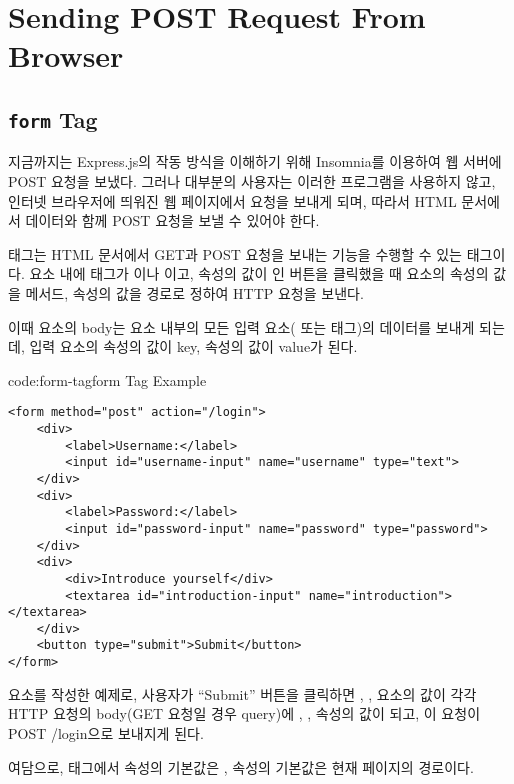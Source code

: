\section{Sending POST Request From Browser}\label{sect:browser-post-request}

\subsection*{\texttt{form} Tag}

지금까지는 Express.js의 작동 방식을 이해하기 위해 Insomnia를 이용하여 웹 서버에 POST 요청을 보냈다. 그러나 대부분의 사용자는 이러한 프로그램을 사용하지 않고, 인터넷 브라우저에 띄워진 웹 페이지에서 요청을 보내게 되며, 따라서 HTML 문서에서  데이터와 함께 POST 요청을 보낼 수 있어야 한다.

 태그는 HTML 문서에서 GET과 POST 요청을 보내는 기능을 수행할 수 있는 태그이다.  요소 내에 태그가 이나 이고,  속성의 값이 인 버튼을 클릭했을 때  요소의  속성의 값을 메서드,  속성의 값을 경로로 정하여 HTTP 요청을 보낸다.

이때  요소의 body는 요소 내부의 모든 입력 요소( 또는  태그)의 데이터를 보내게 되는데, 입력 요소의  속성의 값이 key,  속성의 값이 value가 된다.

\begin{code}{code:form-tag}{form Tag Example}
\begin{verbatim}
<form method="post" action="/login">
    <div>
        <label>Username:</label>
        <input id="username-input" name="username" type="text">
    </div>
    <div>
        <label>Password:</label>
        <input id="password-input" name="password" type="password">
    </div>
    <div>
        <div>Introduce yourself</div>
        <textarea id="introduction-input" name="introduction"></textarea>
    </div>
    <button type="submit">Submit</button>
</form>
\end{verbatim}
\end{code}

\는  요소를 작성한 예제로, 사용자가 ``Submit'' 버튼을 클릭하면 , ,  요소의  값이 각각 HTTP 요청의 body(GET 요청일 경우 query)에 , ,  속성의 값이 되고, 이 요청이 POST /login으로 보내지게 된다.

여담으로,  태그에서  속성의 기본값은 ,  속성의 기본값은 현재 페이지의 경로이다.

